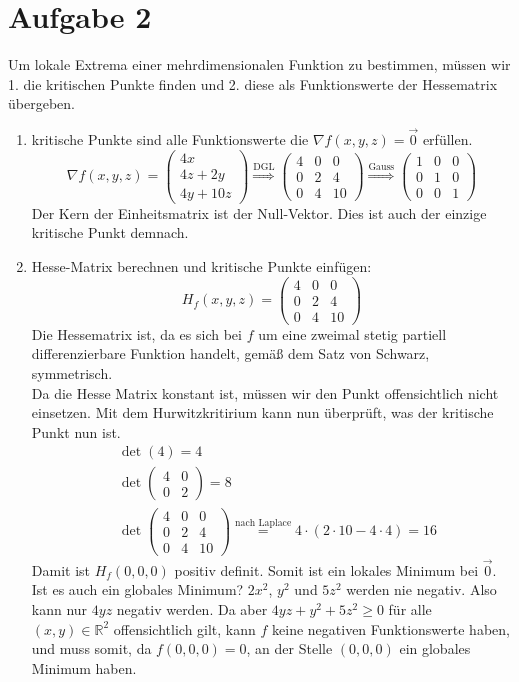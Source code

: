 \documentclass[10pt,a4paper,parskip=half]{scrartcl}
\begin{document}
\section*{Aufgabe 2}
Um lokale Extrema einer mehrdimensionalen Funktion zu bestimmen, müssen wir 1. die kritischen Punkte finden und 2. diese als Funktionswerte der Hessematrix übergeben.
\begin{enumerate}
	\item kritische Punkte sind alle Funktionswerte die $\nabla f(x,y,z) = \vec0$ erfüllen.
	\[\nabla f(x,y,z) = 
	\begin{pmatrix}
		4x \\ 
		4z + 2y \\
		4y + 10z	
	\end{pmatrix} \overset{\text{DGL}}{\Rightarrow}
	\begin{pmatrix}
		4 & 0 & 0 \\
		0 & 2 & 4 \\
		0 & 4 & 10 
	\end{pmatrix} \overset{\text{Gauss}}{\Rightarrow}
	\begin{pmatrix}
		1 & 0 & 0 \\
		0 & 1 & 0 \\
		0 & 0 & 1
	\end{pmatrix}\]
	Der Kern der Einheitsmatrix ist der Null-Vektor. Dies ist auch der einzige kritische Punkt demnach.
	\item Hesse-Matrix berechnen und kritische Punkte einfügen:
	\[H_f(x,y,z) =
	\begin{pmatrix}
		4 & 0 & 0 \\
		0 & 2 & 4 \\
		0 & 4 & 10
	\end{pmatrix}
	\] 
	Die Hessematrix ist, da es sich bei $f$ um eine zweimal stetig partiell differenzierbare Funktion handelt, gemäß dem Satz von Schwarz, symmetrisch.\\
	Da die Hesse Matrix konstant ist, müssen wir den Punkt offensichtlich nicht einsetzen. Mit dem Hurwitzkritirium kann nun überprüft, was der kritische Punkt nun ist. 
	\begin{align*}
	 	&\det(4) = 4 \\
	 	&\det \begin{pmatrix}
	 		4 & 0 \\
	 		0 & 2	
	 	\end{pmatrix} = 8 \\
	 	&\det \begin{pmatrix}
	 		4 & 0 & 0 \\
			0 & 2 & 4 \\
			0 & 4 & 10
	 	\end{pmatrix} \overset{\text{nach Laplace}}{=} 4\cdot (2\cdot10 - 4\cdot4) = 16
	 \end{align*} Damit ist $H_f(0,0,0)$ positiv definit. Somit ist ein lokales Minimum bei $\vec 0$. Ist es auch ein globales Minimum? 
	$2x^2$, $y^2$ und $5z^2$ werden nie negativ. Also kann nur $4yz$ negativ werden. Da aber $4yz  + y^2 + 5z^2 \ge 0$ für alle $(x,y) \in \mathbb{R}^2$ offensichtlich gilt, kann $f$ keine negativen Funktionswerte haben,  und muss somit, da $f(0,0,0) = 0$, an der Stelle $(0,0,0)$ ein globales Minimum haben.
\end{enumerate}
\end{document}
